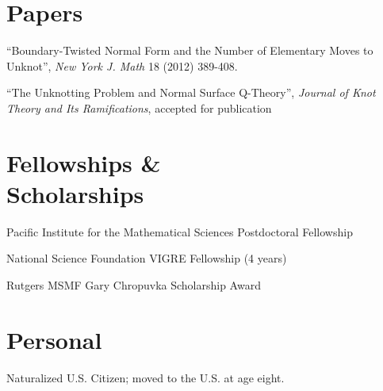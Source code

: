 \documentclass[margin]{res}
\begin{document}
\begin{resume}
\section{\helv Papers}
\begin{list1}
\item ``Boundary-Twisted Normal Form and the Number of Elementary Moves to Unknot'', \emph{New York J. Math} 18 (2012) 389-408. 
\item ``The Unknotting Problem and Normal Surface Q-Theory'', \emph{Journal of Knot Theory and Its Ramifications}, accepted for publication
\end{list1}
\vspace{-0.1in}

\section{\helv Fellowships \&\\ Scholarships}
\begin{list1}
\item Pacific Institute for the Mathematical Sciences Postdoctoral Fellowship
\item National Science Foundation VIGRE Fellowship (4 years)
\item Rutgers MSMF Gary Chropuvka Scholarship Award
\end{list1}
\vspace{-0.1in}
\section{\helv Personal}
\begin{list1}
\item Naturalized U.S. Citizen; moved to the U.S. at age eight.
\end{list1}

\end{resume}
\end{document}
